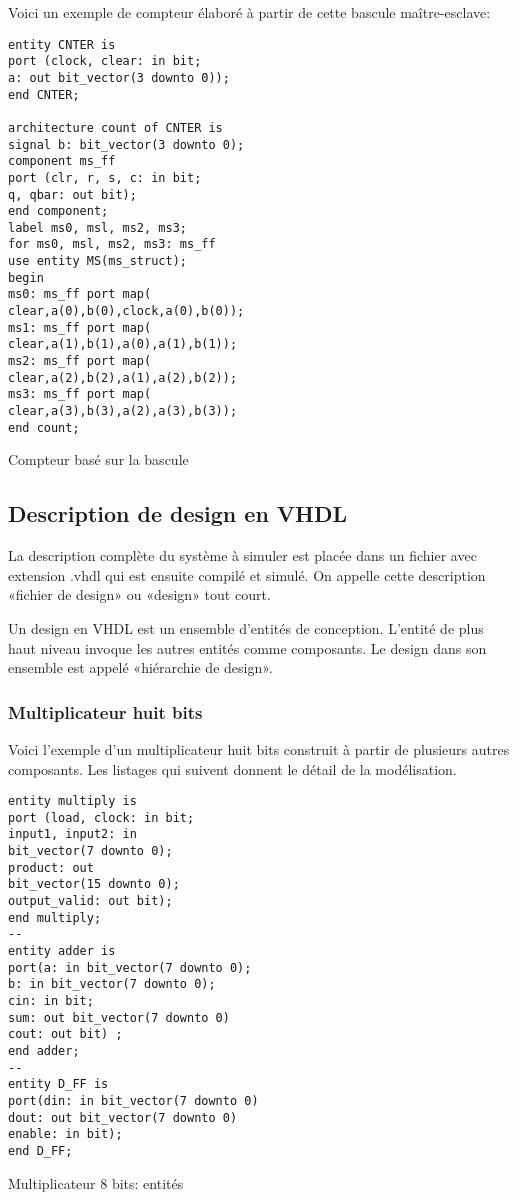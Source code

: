 \documentclass[11pt]{article}
\begin{document}
Voici un exemple de compteur élaboré à partir de cette bascule maître-esclave:

\begin{listing}[htbp]
\begin{verbatim}
entity CNTER is
port (clock, clear: in bit;
a: out bit_vector(3 downto 0));
end CNTER;

architecture count of CNTER is
signal b: bit_vector(3 downto 0);
component ms_ff
port (clr, r, s, c: in bit;
q, qbar: out bit);
end component;
label ms0, msl, ms2, ms3;
for ms0, msl, ms2, ms3: ms_ff
use entity MS(ms_struct);
begin
ms0: ms_ff port map(
clear,a(0),b(0),clock,a(0),b(0));
ms1: ms_ff port map(
clear,a(1),b(1),a(0),a(1),b(1));
ms2: ms_ff port map(
clear,a(2),b(2),a(1),a(2),b(2));
ms3: ms_ff port map(
clear,a(3),b(3),a(2),a(3),b(3));
end count;
\end{verbatim}
\caption{Compteur basé sur la bascule}
\end{listing}


\subsection{Description de design en VHDL}
\label{sec:orgebee3f5}

La description complète du système à simuler est placée dans un
fichier avec extension .vhdl qui est ensuite compilé et simulé.  On
appelle cette description «fichier de design» ou «design» tout court.

Un design en VHDL est un ensemble d'entités de conception. L'entité de
plus haut niveau invoque les autres entités comme composants. Le design
dans son ensemble est appelé «hiérarchie de design».

\subsubsection{Multiplicateur huit bits}
\label{sec:orgc3782f5}

Voici l'exemple d'un multiplicateur huit bits construit à partir de
plusieurs autres composants.  Les listages qui suivent donnent le
détail de la modélisation.

\begin{listing}[htbp]
\begin{verbatim}
entity multiply is
port (load, clock: in bit;
input1, input2: in
bit_vector(7 downto 0);
product: out
bit_vector(15 downto 0);
output_valid: out bit);
end multiply;
--
entity adder is
port(a: in bit_vector(7 downto 0);
b: in bit_vector(7 downto 0);
cin: in bit;
sum: out bit_vector(7 downto 0)
cout: out bit) ;
end adder;
--
entity D_FF is
port(din: in bit_vector(7 downto 0)
dout: out bit_vector(7 downto 0)
enable: in bit);
end D_FF;
\end{verbatim}
\caption{Multiplicateur 8 bits: entités}
\end{listing}
\end{document}
